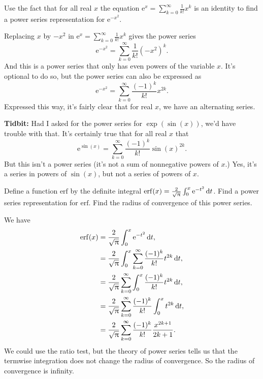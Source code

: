 \documentclass[12pt,fleqn,answers]{exam}
\newcommand{\erf}{\mathrm{erf}}
\begin{document}
\begin{questions} 

\question [1] Use the fact that for all real $x$ the equation $\displaystyle \mathrm{e}^x = \sum_{k=0}^\infty \frac{1}{k!}  x^k$ is an identity 
 to find a power series representation for $\mathrm{e}^{-x^2} $.
\begin{solution}[2.5in]
Replacing $x$ by $-x^2$ in $\displaystyle \mathrm{e}^x = \sum_{k=0}^\infty \frac{1}{k!}  x^k$ gives the power series
\begin{equation*}
\mathrm{e}^{-x^2} = \sum_{k=0}^\infty \frac{1}{k!}  (-x^2)^k.
\end{equation*}
And this is a power series that only has even powers of the variable $x$. It's optional to do so, but the power series 
can also be expressed as
\begin{equation*}
\mathrm{e}^{-x^2} = \sum_{k=0}^\infty \frac{(-1)^k}{k!}  x^{2 k}.
\end{equation*}
Expressed this way, it's fairly clear that for real $x$, we have an alternating series.

\textbf{Tidbit:} Had I asked for the power series for $\exp(\sin(x))$, we'd have trouble with that. It's certainly 
true that for all real $x$ that
\begin{equation*}
  \mathrm{e}^{\sin(x)} = \sum_{k=0}^\infty \frac{(-1)^k}{k!}  \sin(x)^{2 k}.
\end{equation*}
But this isn't a power series (it's not a sum of nonnegative powers of $x$.) Yes, it's a series in powers of 
$\sin(x)$, but not a series of powers of $x$.
\end{solution}


\question [1] Define a function $\erf$ by the definite integral $\erf(x) = \frac{2}{\sqrt{\uppi}} \large \int_0^x \mathrm{e}^{-t^2} \, \mathrm{d} t$.
Find a power series representation for $\erf$.  Find the radius of convergence of this power series.
\begin{solution}%
We have
\begin{align*}
\erf(x) &= \frac{2}{\sqrt{\uppi}} \large \int_0^x \mathrm{e}^{-t^2} \, \mathrm{d} t, \\
            &= \frac{2}{\sqrt{\uppi}} \large \int_0^x \sum_{k=0}^\infty \frac{(-1)^k}{k!}  t^{2 k} \, \mathrm{d} t, \\
            &= \frac{2}{\sqrt{\uppi}}  \sum_{k=0}^\infty \large \int_0^x \frac{(-1)^k}{k!}  t^{2 k} \, \mathrm{d} t, \\
            &= \frac{2}{\sqrt{\uppi}}  \sum_{k=0}^\infty\frac{(-1)^k}{k!} \large \int_0^x   t^{2 k} \, \mathrm{d} t, \\
            &= \frac{2}{\sqrt{\uppi}}  \sum_{k=0}^\infty\frac{(-1)^k}{k!} \frac{x^{2 k+1}}{2 k + 1}.
\end{align*}
We could use the ratio test, but the theory of power series tells us that the termwise integration does not change
the radius of convergence. So the radius of convergence is infinity.
\end{solution}


\end{questions}
\end{document}
